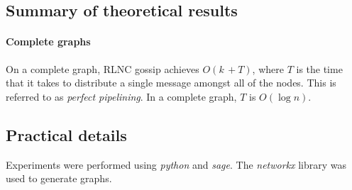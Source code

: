 \documentclass{article} %
\def\numMessages{\textit{k}\,}
\begin{document}
\subsection{Summary of theoretical results}
\paragraph{Complete graphs}
On a complete graph, RLNC gossip achieves $O(\numMessages + T)$, where $T$ is the time that it takes to distribute a single message amongst all of the nodes. This is referred to as \textit{perfect pipelining}. In a complete graph, $T$ is $O(\log{n})$. 

\subsection{Practical details}
Experiments were performed using \textit{python} and \textit{sage}. The \textit{networkx} library was used to generate graphs.
\end{document}
